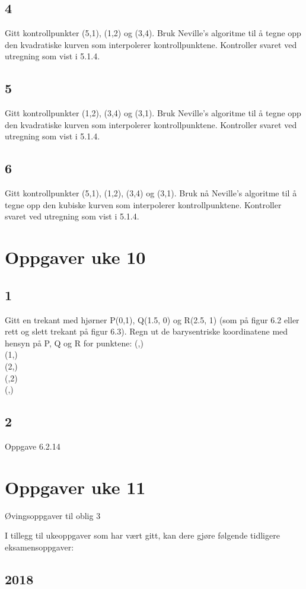 \documentclass[a4paper,norsk]{article}
\begin{document}
\subsection{4}
Gitt kontrollpunkter (5,1), (1,2) og (3,4). Bruk Neville's algoritme til å tegne opp den kvadratiske kurven som interpolerer kontrollpunktene. Kontroller svaret ved utregning som vist i 5.1.4.
\subsection{5}
Gitt kontrollpunkter (1,2), (3,4) og (3,1). Bruk Neville's algoritme til å tegne opp den kvadratiske kurven som interpolerer kontrollpunktene. Kontroller svaret ved utregning som vist i 5.1.4.
\subsection{6}
Gitt kontrollpunkter (5,1), (1,2), (3,4) og (3,1). Bruk nå Neville's algoritme til å tegne opp den kubiske kurven som interpolerer kontrollpunktene. Kontroller svaret ved utregning som vist i 5.1.4.
\section{Oppgaver uke 10}
\subsection{1}
Gitt en trekant med hjørner P(0,1), Q(1.5, 0) og R(2.5, 1) (som  på figur 6.2 eller rett og slett trekant  på figur 6.3). Regn ut de barysentriske koordinatene med hensyn på P, Q og R for  punktene:
(,)\\
	(1,)\\
	(2,)\\
	(,2)\\
	(,)
\subsection{2}
Oppgave 6.2.14
\section{Oppgaver uke 11}
Øvingsoppgaver til oblig 3

I tillegg til ukeoppgaver som har vært gitt, kan dere gjøre følgende tidligere eksamensoppgaver:
\subsection{2018}
\end{document}
